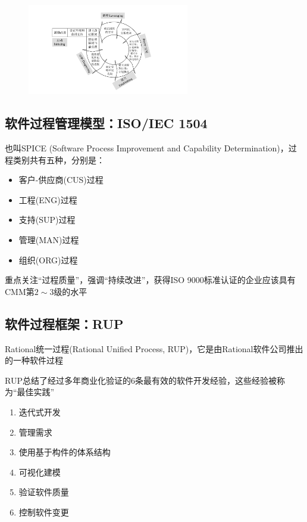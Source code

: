 \begin{figure}[H]
    \vspace{-0.5em}
	\centering
	\includegraphics[width=0.63\textwidth]{images/IDEAL.pdf}
    \vspace{-1em}
\end{figure}


\subsection{软件过程管理模型：ISO/IEC 1504}
也叫SPICE (Software Process Improvement and Capability Determination)，过程类别共有五种，分别是：
\vspace{-0.8em}
\begin{multicols}{3}
    \begin{itemize}
        \item 客户-供应商(CUS)过程
        \item 工程(ENG)过程
        \item 支持(SUP)过程
        \item 管理(MAN)过程
        \item 组织(ORG)过程
    \end{itemize}
\end{multicols}
\vspace{-1em}

重点关注“过程质量”，强调“持续改进”，获得ISO 9000标准认证的企业应该具有CMM第$2\sim 3$级的水平


\subsection{软件过程框架：RUP}
Rational统一过程(Rational Unified Process, RUP)，它是由Rational软件公司推出的一种软件过程

RUP总结了经过多年商业化验证的6条最有效的软件开发经验，这些经验被称为“最佳实践”
\vspace{-0.8em}
\begin{multicols}{3}
    \begin{enumerate}[label=\arabic*.]
        \item 迭代式开发
        \item 管理需求
        \item 使用基于构件的体系结构
        \item 可视化建模
        \item 验证软件质量
        \item 控制软件变更
    \end{enumerate}
\end{multicols}
\vspace{-1em}

